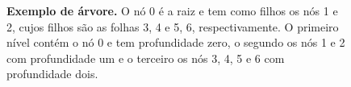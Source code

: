 \begin{figure}
  \centering
  \caption[Exemplo de árvore.]
  {\textbf{Exemplo de árvore.} O nó 0 é a raiz e tem como filhos os nós 1 e 2, cujos
  filhos são as folhas 3, 4 e 5, 6, respectivamente. O primeiro nível contém o nó 0 e
  tem profundidade zero, o segundo os nós 1 e 2 com profundidade um e o terceiro os nós
  3, 4, 5 e 6 com profundidade dois.}
  \end{figure}
  
